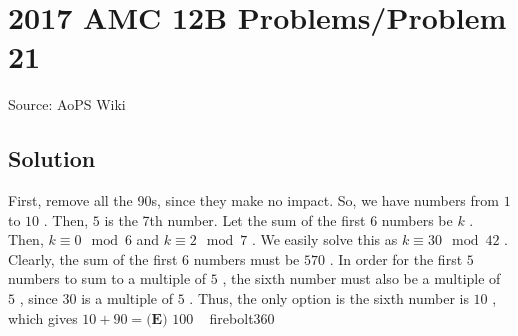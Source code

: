 \documentclass[12pt]{article}
\begin{document}
\section*{{2017 AMC 12B Problems/Problem 21}}
Source: AoPS Wiki

\subsection*{Solution}
First, remove all the 90s, since they make no impact. So, we have numbers from $1$ to $10$ . Then, $5$ is the 7th number. Let the sum of the first $6$ numbers be $k$ . Then, $k\equiv 0 \mod 6$ and $k\equiv 2 \mod 7$ . We easily solve this as $k \equiv 30 \mod 42$ . Clearly, the sum of the first $6$ numbers must be $570$ . In order for the first $5$ numbers to sum to a multiple of $5$ , the sixth number must also be a multiple of $5$ , since $30$ is a multiple of $5$ . Thus, the only option is the sixth number is $10$ , which gives $10+90= \boxed{\textbf{(E) }100}$ ~ firebolt360
\end{document}

